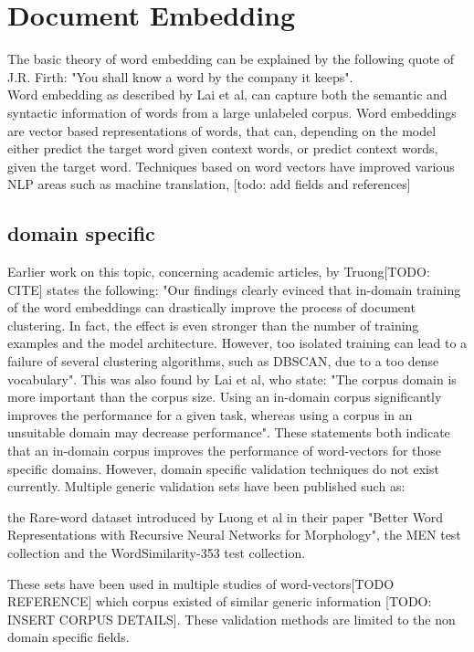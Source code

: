 \documentclass[../../Thesis.tex]{subfiles}
\begin{document}
\section{Document Embedding}
The basic theory of word embedding can be explained by the following quote of J.R. Firth: "You shall know a word by the company it keeps". \\
Word embedding as described by Lai et al, can capture both the semantic and syntactic
information of words from a large unlabeled corpus.\cite{lai2016generate} Word embeddings are vector based representations of words, that can, depending on the model either predict the target word given context words, or predict context words, given the target word. Techniques based on word vectors have improved various NLP areas such as machine translation, [todo: add fields and references]

\subsection{domain specific}
Earlier work on this topic, concerning academic articles, by Truong[TODO: CITE] states the following: "Our findings clearly evinced that in-domain training of the
word embeddings can drastically improve the process of document clustering. In fact, the
effect is even stronger than the number of training examples and the model architecture.
However, too isolated training can lead to a failure of several clustering algorithms, such
as DBSCAN, due to a too dense vocabulary". This was also found by Lai et al, who state: "The corpus domain is more important than the corpus size. Using an in-domain corpus significantly improves the performance for a given task, whereas using a corpus in an unsuitable domain may decrease performance". These statements both indicate that an in-domain corpus improves the performance of word-vectors for those specific domains. However, domain specific validation techniques do not exist currently. Multiple generic validation sets have been published such as:

the Rare-word dataset introduced by Luong et al in their paper "Better Word Representations with Recursive Neural Networks for Morphology"\cite{luong2013better}, 
the MEN test collection\cite{EBruniMENCollection} and the WordSimilarity-353 test collection\cite{EGabrilovichWScollection}.

These sets have been used in multiple studies of word-vectors[TODO REFERENCE] which corpus existed of similar generic information [TODO: INSERT CORPUS DETAILS]. These validation methods are limited to the non domain specific fields. 
\end{document}
